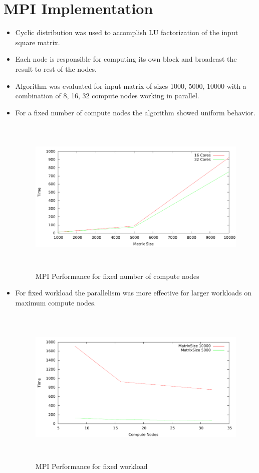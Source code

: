 \documentclass{article}
\begin{document}
\section{MPI Implementation}
\begin{itemize}
\item Cyclic distribution was used to accomplish LU factorization of the input square matrix.
\item Each node is responsible for computing its own block and broadcast the result to rest of the nodes.
\item Algorithm was evaluated for input matrix of sizes 1000, 5000, 10000 with a combination of 8, 16, 32 compute nodes working in parallel.
\item For a fixed number of compute nodes the algorithm showed uniform behavior.

\begin{figure}[H]
\begin{center}
\includegraphics[height=3in,width=5in]{Graphs/mpi_siz_time.pdf}
\caption{MPI Performance for fixed number of compute nodes}
\end{center}
\end{figure}

\item For fixed workload the parallelism was more effective for larger workloads on maximum compute nodes.
\begin{figure}[H]
\begin{center}
\includegraphics[height=3in,width=5in]{Graphs/mpi_core_time.pdf}
\caption{MPI Performance for fixed workload}
\end{center}
\end{figure}

\end{itemize}
\end{document}
